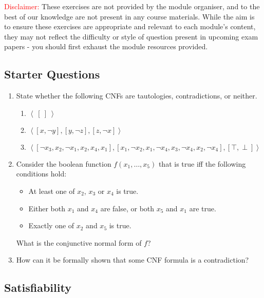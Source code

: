 \documentclass[a4paper, 12pt]{article}
\begin{document}
{\small \textcolor{red}{Disclaimer:}
These exercises are not provided by the module organiser, and to the best of our knowledge are not present in any course materials.
While the aim is to ensure these exercises are appropriate and relevant to each module's content, they may not reflect the difficulty or style of question present in upcoming exam papers - you should first exhaust the module resources provided.
}

\subsection*{Starter Questions}

\begin{enumerate}

\item State whether the following CNFs are tautologies, contradictions, or neither.
\begin{enumerate}
    \item $\left< \> \left[ \> \right] \> \right>$
    \item $\left< [x, \neg y], [y, \neg z], [z,  \neg x] \right>$
    \item $\left< [\neg x_3, x_2, \neg x_1, x_2, x_4, x_1], [x_1, \neg x_2, x_1, \neg x_4, x_3, \neg x_4, x_2, \neg x_4], [\top, \perp] \right>$
\end{enumerate}

\item Consider the boolean function $f(x_1, \dots, x_5)$ that is true iff the following conditions hold:
\begin{itemize}
    \item At least one of $x_2$, $x_3$ or $x_4$ is true.
    \item Either both $x_1$ and $x_4$ are false, or both $x_5$ and $x_1$ are true.
    \item Exactly one of $x_2$ and $x_5$ is true.
\end{itemize}
What is the conjunctive normal form of $f$?

\item How can it be formally shown that some CNF formula is a contradiction?

\end{enumerate}

\newpage

\subsection*{Satisfiability}
\end{document}

